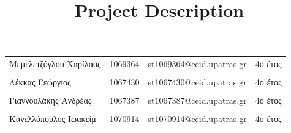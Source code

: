 \documentclass{../ol-softwaremanual}
\begin{document}
	
	
	\begin{titlepage}
		
		
		\title{\en Project Description \\}
	\end{titlepage}
	
	
	\maketitle
	
	\newpage
	
	
	\vspace{60pt}
	
	
	
	\begin{table}[htbp!]
		\begin{tabular}{llll}
			Μεμελετζόγλου Χαρίλαος & 1069364 & \en st1069364@ceid.upatras.gr  & \gr 4ο έτος \\ 
			\\ Λέκκας Γεώργιος      &      1067430    &   \en st1067430@ceid.upatras.gr  & \gr 4ο έτος \\
			\\ Γιαννουλάκης Ανδρέας        &   1067387       & \en st1067387@ceid.upatras.gr  & \gr 4ο έτος         \\
			\\ Κανελλόπουλος Ιωακείμ        &  1070914        &    \en st1070914@ceid.upatras.gr     & \gr 4ο έτος   \\ 
		\end{tabular}
	\end{table}
	
\end{document}
